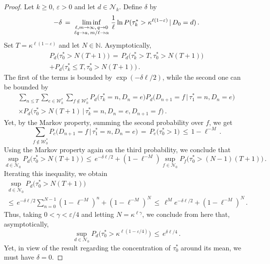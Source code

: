 \documentclass[a4paper,12pt]{article}
\theoremstyle{definition}
\theoremstyle{remark}
\def \cN {\mathcal{N}}
\def \cW {\mathcal{W}}
\def \a {\alpha}
\def \g {\gamma}
\def \d {\delta}
\def \e {\varepsilon}
\def \k {\kappa}
\def \N {\mathbb{N}}
\def \cW {{\mathcal W}^*}
\def\lmq {{\genfrac{}{}{0pt}{1}{\ell,m\to\infty,\,q\to0}{\ell q\to a,\,m/\ell\to\a}}}
\begin{document}
\begin{proof}
Let $k\geq0$, $\e>0$ and let $d\in\cN_k$. Define $\d$ by 
$$-\d\,=\,\liminf_\lmq \frac{1}{\ell}\ln P(\tau_k^*>\k^{\ell(1-\e)}\,|\,D_0=d)\,.$$
Set $T=\k^{\ell(1-\e)}$ and let $N\in\N$. Asymptotically,
\begin{multline*}
P_d\big(\tau_0^*>N(T+1)\big)\,=\,P_d\big(\tau_k^*>T,\tau_0^*>N(T+1)\big)\\
+P_d\big(\tau_k^*\leq T,\tau^*_0>N(T+1)\big)\,.
\end{multline*}
The first of the terms is bounded by $\exp(-\d\ell/2)$, while the second one can be 
bounded by 
\begin{multline*}
\sum_{n\leq T}\sum_{e\in\cW_k}\sum_{f\not\in\cW_0}P_d\big(
\tau_k^*=n,D_n=e
\big)P_d\big(
D_{n+1}=f\,\big|\,\tau_1^*=n,D_n=e
\big)\\\times
P_d\big(
\tau_0^*>N(T+1)\,\big|\,\tau_k^*=n,D_n=e,D_{n+1}=f
\big)\,.
\end{multline*}
Yet, by the Markov property,
summing the second probability over $f$, we get
$$\sum_{f\not\in\cW_0}P_c\big(
D_{n+1}=f\,\big|\,\tau_1^*=n,D_n=e
\big)\,=\,P_e\big(\tau_0^*>1\big)\,\leq\,1-\ell^{-M}\,.$$
Using the Markov property again on the third probability, we conclude that
$$\sup_{d\in\cN_0}P_d\big(
\tau_0^*>N(T+1)
\big)\,\leq\,
e^{-\d\ell/2}+(1-\ell^{-M})\sup_{f\in\cN_0}P_f\big(
\tau_0^*>(N-1)(T+1)
\big)\,.
$$
Iterating this inequality, we obtain
\begin{multline*}
\sup_{d\in\cN_0}P_d\big(
\tau_0^*>N(T+1)
\big)\\\leq\,e^{-\d\ell/2}\sum_{n=0}^{N-1}(1-\ell^{-M})^n+(1-\ell^{-M})^N\,\leq\,\ell^Me^{-\d\ell/2} +(1-\ell^{-M})^N\,.
\end{multline*}
Thus, taking $0<\g<\e/4$ and letting $N=\k^{\ell\g}$,
we conclude from here that, asymptotically,
$$\sup_{d\in\cN_0}P_d\big(
\tau_0^*>\k^{\ell(1-\e/4)}
\big)\,\leq\,
e^{\d\ell/4}\,.
$$
Yet, in view of the result regarding the concentration of $\tau_0^*$ around its mean,
we must have $\d=0$.
\end{proof}
\end{document}
